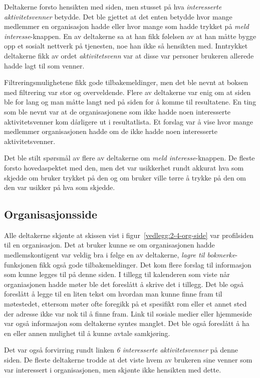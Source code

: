 Deltakerne forsto hensikten med siden, men stusset på hva {\em interesserte aktivitetsvenner} betydde. Det ble gjettet at det enten betydde hvor mange medlemmer en organisasjon hadde eller hvor mange som hadde trykket på {\em meld interesse}-knappen. En av deltakerne sa at han fikk følelsen av at han måtte bygge opp et sosialt nettverk på tjenesten, noe han ikke så hensikten med. Inntrykket deltakerne fikk av ordet {\em aktivitetsvenn} var at disse var personer brukeren allerede hadde lagt til som venner.

Filtreringsmulighetene fikk gode tilbakemeldinger, men det ble nevnt at boksen med filtrering var stor og overveldende. Flere av deltakerne var enig om at siden ble for lang og man måtte langt ned på siden for å komme til resultatene. En ting som ble nevnt var at de organisasjonene som ikke hadde noen interesserte aktivitetsvenner kom dårligere ut i resultatlista. Et forslag var å vise hvor mange medlemmer organisasjonen hadde om de ikke hadde noen interesserte aktivitetsvenner.

Det ble stilt spørsmål av flere av deltakerne om {\em meld interesse}-knappen. De fleste forsto hovedaspektet med den, men det var usikkerhet rundt akkurat hva som skjedde om bruker trykket på den og om bruker ville tørre å trykke på den om den var usikker på hva som skjedde.


\subsection{Organisasjonsside}

Alle deltakerne skjønte at skissen vist i figur~\ref{vedlegg:2-4-org-side} var profilsiden til en organisasjon. Det at bruker kunne se om organisasjonen hadde medlemskontigent var veldig bra i følge en av deltakerne, {\em lagre til bokmerke}-funksjonen fikk også gode tilbakemeldinger. Det kom flere forslag til informasjon som kunne legges til på denne siden. I tillegg til kalenderen som viste når organiasjonen hadde møter ble det foreslått å skrive det i tillegg. Det ble også foreslått å legge til en liten tekst om hvordan man kunne finne fram til møtestedet, ettersom møter ofte foregikk på et spesifikt rom eller et annet sted der adresse ikke var nok til å finne fram. Link til sosiale medier eller hjemmeside var også informasjon som deltakerne syntes manglet. Det ble også foreslått å ha en eller annen mulighet til å kunne avtale samkjøring.

Det var også forvirring rundt linken {\em 6 interesserte aktivitetsvenner} på denne siden. De fleste deltakerne trodde at det viste hvem av brukeren sine venner som var interessert i organisasjonen, men skjønte ikke hensikten med dette.


